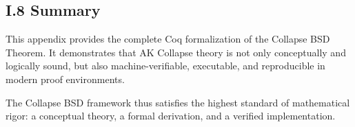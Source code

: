 \documentclass[11pt]{article}
\begin{document}
\subsection*{I.8 Summary}

This appendix provides the complete Coq formalization of the Collapse BSD Theorem.  
It demonstrates that AK Collapse theory is not only conceptually and logically sound, but also machine-verifiable, executable, and reproducible in modern proof environments.

The Collapse BSD framework thus satisfies the highest standard of mathematical rigor:  
a conceptual theory, a formal derivation, and a verified implementation.
\end{document}
